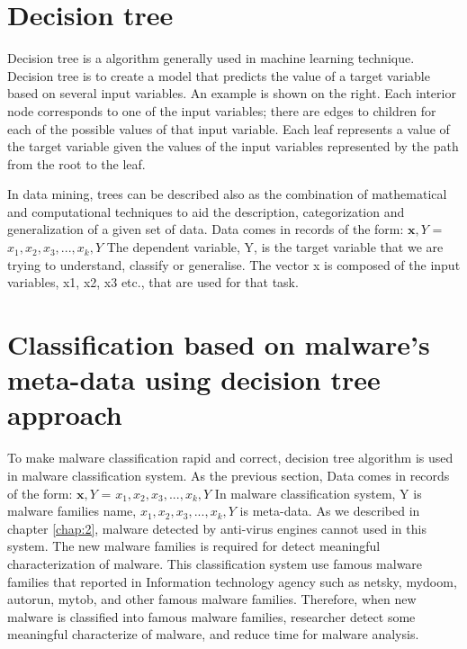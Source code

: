 \section{Decision tree\cite{wikipedia}}
Decision tree is a algorithm generally used in machine learning technique. Decision tree is to create a model that predicts the value of a target variable based on several input variables. An example is shown on the right. Each interior node corresponds to one of the input variables; there are edges to children for each of the possible values of that input variable. Each leaf represents a value of the target variable given the values of the input variables represented by the path from the root to the leaf.

In data mining, trees can be described also as the combination of mathematical and computational techniques to aid the description, categorization and generalization of a given set of data.
Data comes in records of the form:
\(\textbf{x},Y\) = \(x_1, x_2, x_3, ..., x_k, Y\)
The dependent variable, Y, is the target variable that we are trying to understand, classify or generalise. The vector x is composed of the input variables, x1, x2, x3 etc., that are used for that task.
\section{Classification based on malware's meta-data using decision tree approach}
To make malware classification rapid and correct, decision tree algorithm is used in malware classification system.
As the previous section, Data comes in records of the form:
\(\textbf{x},Y\) = \(x_1, x_2, x_3, ..., x_k, Y\)
In malware classification system, Y is malware families name, \(x_1, x_2, x_3, ..., x_k, Y\) is meta-data. As we described in chapter \ref{chap:2}, malware detected by anti-virus engines cannot used in this system. The new malware families is required for detect meaningful characterization of malware. This classification system use famous malware families that reported in Information technology agency such as netsky, mydoom, autorun, mytob, and other famous malware families. Therefore, when new malware is classified into famous malware families, researcher detect some meaningful characterize of malware, and reduce time for malware analysis. 

